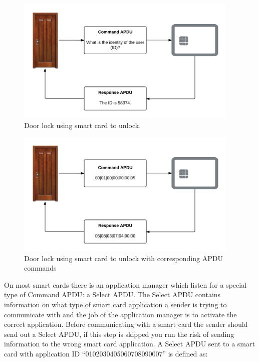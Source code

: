 \begin{figure}[h!]
  \captionsetup{justification=centering,margin=1.5cm}
  \caption{Door lock using smart card to unlock.}
  \label{fig:doornfc}
  \centering
    \includegraphics[width=0.95\textwidth]{images/doornfc.png}
\end{figure}


\begin{figure}[h!]
  \captionsetup{justification=centering,margin=1.5cm}
  \caption{Door lock using smart card to unlock with corresponding APDU commands}
  \label{fig:doornfcapdu}
  \centering
    \includegraphics[width=0.95\textwidth]{images/doornfc_apdu.png}
\end{figure}

On most smart cards there is an application manager which listen for a special type of Command APDU: a Select APDU. The Select APDU contains information on what type of smart card application a sender is trying to communicate with and the job of the application manager is to activate the correct application. Before communicating with a smart card the sender should send out a Select APDU, if this step is skipped you run the risk of sending information to the wrong smart card application. A Select APDU sent to a smart card with application ID ``0102030405060708090007'' is defined as:

